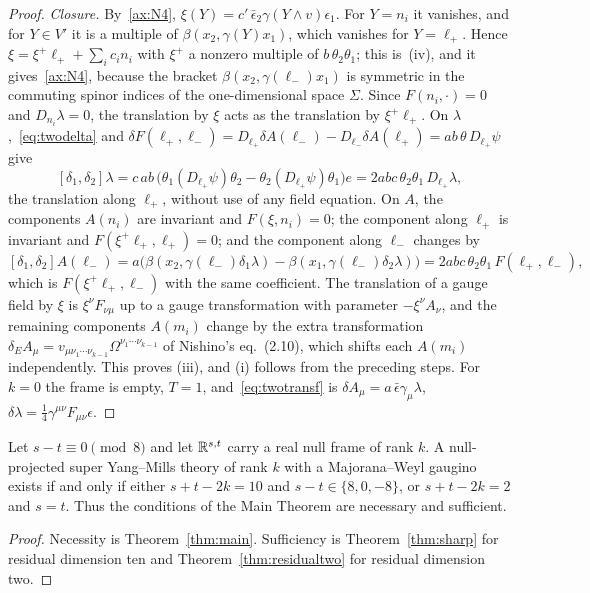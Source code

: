 \begin{proof}
\emph{Closure.} By~\ref{ax:N4}, $\xi(Y)=c'\,\bar\epsilon_2\gamma(Y\wedge v)\epsilon_1$. For $Y=n_i$ it vanishes, and for $Y\in V'$ it is a multiple of $\beta(x_2,\gamma(Y)x_1)$, which vanishes for $Y=\ell_+$. Hence $\xi=\xi^+\ell_++\sum_ic_in_i$ with $\xi^+$ a nonzero multiple of $b\,\theta_2\theta_1$; this is~(iv), and it gives~\ref{ax:N4}, because the bracket $\beta(x_2,\gamma(\ell_-)x_1)$ is symmetric in the commuting spinor indices of the one-dimensional space $\Sigma$. Since $F(n_i,\cdot)=0$ and $D_{n_i}\lambda=0$, the translation by $\xi$ acts as the translation by $\xi^+\ell_+$. On $\lambda$,~\eqref{eq:twodelta} and $\delta F(\ell_+,\ell_-)=D_{\ell_+}\delta A(\ell_-)-D_{\ell_-}\delta A(\ell_+)=ab\,\theta\,D_{\ell_+}\psi$ give
\[
[\delta_1,\delta_2]\lambda=c\,ab\,\bigl(\theta_1(D_{\ell_+}\psi)\theta_2-\theta_2(D_{\ell_+}\psi)\theta_1\bigr)e=2abc\,\theta_2\theta_1\,D_{\ell_+}\lambda ,
\]
the translation along $\ell_+$, without use of any field equation. On $A$, the components $A(n_i)$ are invariant and $F(\xi,n_i)=0$; the component along $\ell_+$ is invariant and $F(\xi^+\ell_+,\ell_+)=0$; and the component along $\ell_-$ changes by
\[
[\delta_1,\delta_2]A(\ell_-)=a\bigl(\beta(x_2,\gamma(\ell_-)\delta_1\lambda)-\beta(x_1,\gamma(\ell_-)\delta_2\lambda)\bigr)=2abc\,\theta_2\theta_1\,F(\ell_+,\ell_-),
\]
which is $F(\xi^+\ell_+,\ell_-)$ with the same coefficient. The translation of a gauge field by $\xi$ is $\xi^\nu F_{\nu\mu}$ up to a gauge transformation with parameter $-\xi^\nu A_\nu$, and the remaining components $A(m_i)$ change by the extra transformation $\delta_EA_\mu=v_{\mu\nu_1\cdots\nu_{k-1}}\Omega^{\nu_1\cdots\nu_{k-1}}$ of Nishino's eq.~(2.10), which shifts each $A(m_i)$ independently. This proves (iii), and (i) follows from the preceding steps. For $k=0$ the frame is empty, $T=1$, and~\eqref{eq:twotransf} is $\delta A_\mu=a\,\bar\epsilon\gamma_\mu\lambda$, $\delta\lambda=\frac14\gamma^{\mu\nu}F_{\mu\nu}\epsilon$.
\end{proof}

\begin{corollary}
\label{cor:sharpall}
Let $s-t\equiv0\pmod8$ and let $\mathbb{R}^{s,t}$ carry a real null frame of rank $k$. A null-projected super Yang--Mills theory of rank $k$ with a Majorana--Weyl gaugino exists if and only if either $s+t-2k=10$ and $s-t\in\{8,0,-8\}$, or $s+t-2k=2$ and $s=t$. Thus the conditions of the Main Theorem are necessary and sufficient.
\end{corollary}

\begin{proof}
Necessity is Theorem~\ref{thm:main}. Sufficiency is Theorem~\ref{thm:sharp} for residual dimension ten and Theorem~\ref{thm:residualtwo} for residual dimension two.
\end{proof}

